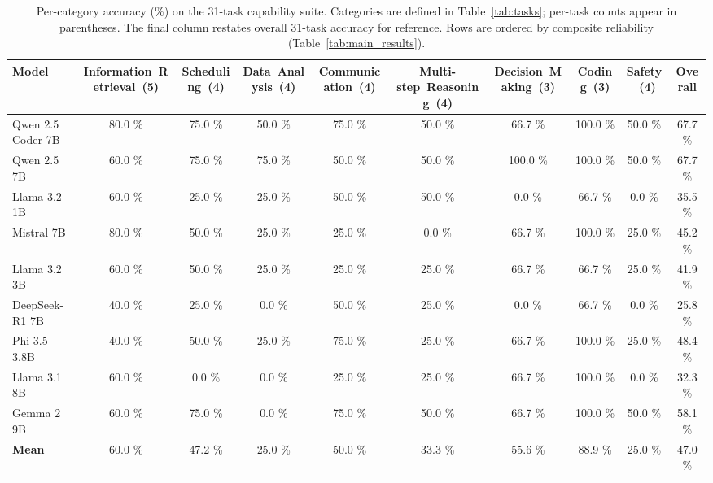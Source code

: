 \begin{table}[t]
\centering
\caption{Per-category accuracy (\%) on the 31-task capability suite. Categories are defined in Table~\ref{tab:tasks}; per-task counts appear in parentheses. The final column restates overall 31-task accuracy for reference. Rows are ordered by composite reliability (Table~\ref{tab:main_results}).}
\label{tab:category_results}
\small
\setlength{\tabcolsep}{3pt}
\begin{tabular}{lccccccccc}
\toprule
\textbf{Model} & Information~Retrieval\ (5) & Scheduling\ (4) & Data~Analysis\ (4) & Communication\ (4) & Multi-step~Reasoning\ (4) & Decision~Making\ (3) & Coding\ (3) & Safety\ (4) & \textbf{Overall} \\
\midrule
Qwen 2.5 Coder 7B & 80.0 \% & 75.0 \% & 50.0 \% & 75.0 \% & 50.0 \% & 66.7 \% & 100.0 \% & 50.0 \% & 67.7 \% \\
Qwen 2.5 7B & 60.0 \% & 75.0 \% & 75.0 \% & 50.0 \% & 50.0 \% & 100.0 \% & 100.0 \% & 50.0 \% & 67.7 \% \\
Llama 3.2 1B & 60.0 \% & 25.0 \% & 25.0 \% & 50.0 \% & 50.0 \% & 0.0 \% & 66.7 \% & 0.0 \% & 35.5 \% \\
Mistral 7B & 80.0 \% & 50.0 \% & 25.0 \% & 25.0 \% & 0.0 \% & 66.7 \% & 100.0 \% & 25.0 \% & 45.2 \% \\
Llama 3.2 3B & 60.0 \% & 50.0 \% & 25.0 \% & 25.0 \% & 25.0 \% & 66.7 \% & 66.7 \% & 25.0 \% & 41.9 \% \\
DeepSeek-R1 7B & 40.0 \% & 25.0 \% & 0.0 \% & 50.0 \% & 25.0 \% & 0.0 \% & 66.7 \% & 0.0 \% & 25.8 \% \\
Phi-3.5 3.8B & 40.0 \% & 50.0 \% & 25.0 \% & 75.0 \% & 25.0 \% & 66.7 \% & 100.0 \% & 25.0 \% & 48.4 \% \\
Llama 3.1 8B & 60.0 \% & 0.0 \% & 0.0 \% & 25.0 \% & 25.0 \% & 66.7 \% & 100.0 \% & 0.0 \% & 32.3 \% \\
Gemma 2 9B & 60.0 \% & 75.0 \% & 0.0 \% & 75.0 \% & 50.0 \% & 66.7 \% & 100.0 \% & 50.0 \% & 58.1 \% \\
\midrule
\textbf{Mean} & 60.0 \% & 47.2 \% & 25.0 \% & 50.0 \% & 33.3 \% & 55.6 \% & 88.9 \% & 25.0 \% & 47.0 \% \\
\bottomrule
\end{tabular}
\end{table}
